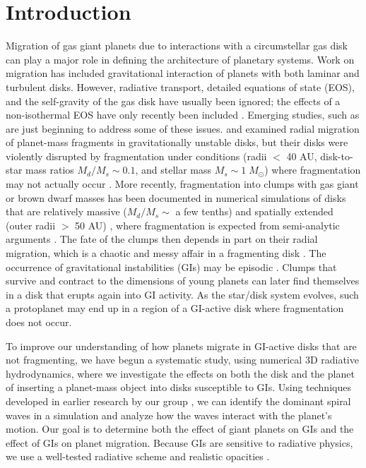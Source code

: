\documentclass[12pt,manuscript,authoryear]{aastex}
\begin{document}
\label{firstpage}

\section{Introduction}

Migration of gas giant planets due to interactions with a circumstellar gas disk can play a major role in defining the architecture of planetary systems. Work on migration \citep[see review by][]{papaloizou2007} has included gravitational interaction of planets with both laminar and turbulent disks. However, radiative transport, detailed equations of state (EOS), and the self-gravity of the gas disk have usually been ignored; the effects of a non-isothermal EOS have only recently been included \citep[e.g.,][]{paardekooper2006,paardekooper2010,paardekooper2011}. Emerging studies, such as \citet{baruteau2011} are just beginning to address some of these issues. 
\citet{boss2005} and \citet{mayer2004} examined radial migration of planet-mass fragments in gravitationally unstable disks, but their disks were violently disrupted by fragmentation under conditions (radii $<$ 40 AU, disk-to-star mass ratios $M_d/M_s \sim 0.1$, and stellar mass $M_s \sim 1\;M_{\odot}$) where fragmentation may not actually occur  \citep{rafikov2005,rafikov2007,boley2006,boley2007b,boley2008,forgan2009,cai2010}. More recently, fragmentation into clumps with gas giant or brown dwarf masses has been documented in numerical simulations of disks that are relatively massive ($M_d/M_s \sim$ a few tenths) and spatially extended (outer radii $>$ 50 AU) \citep{krumholz2007,stamatellos2007,stamatellos2009,boley2009,boley2010}, where fragmentation is expected from semi-analytic arguments \citep[e.g.,][]{clarke2009,rafikov2009,dodson2009}. The fate of the clumps then depends in part on their radial migration, which is a chaotic and messy affair in a fragmenting disk \citep[e.g.,][]{boley2009,boley2010,vorobyov2010,boley2010b}. The occurrence of gravitational instabilities (GIs) may be episodic \citep[e.g.,][]{vorobyov2006,vorobyov2010b,zhu2010}. Clumps that survive and contract to the dimensions of young planets can later find themselves in a disk that erupts again into GI activity. As the star/disk system evolves, such a protoplanet may end up in a region of a GI-active disk where fragmentation does not occur.

To improve our understanding of how planets migrate in GI-active disks that are not fragmenting, we have begun a systematic study, using numerical 3D radiative hydrodynamics, where we investigate the effects on both the disk and the planet of inserting a planet-mass object into disks susceptible to GIs. Using techniques developed in earlier research by our group \citep{pickett2003, mejia2005,cai2006,cai2008,boley2006,boley2007b,michael2010}, we can identify the dominant spiral waves in a simulation and analyze how the waves interact with the planet's motion. Our goal is to determine both the effect of giant planets on GIs and the effect of GIs on planet migration. Because GIs are sensitive to radiative physics, we use a well-tested radiative scheme \citep{boley2007b} and realistic opacities \citep{dalessio2001}. 
\end{document}
